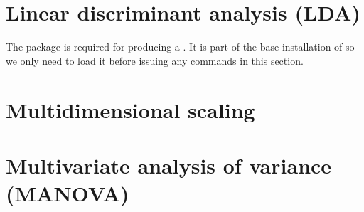 \section{Linear discriminant analysis (LDA)} 
 
The  package is required for producing a . It is part of the base installation of \R{} so we only need to load it before issuing any commands in this section. 
\begin{knitrout}
\color{fgcolor}\begin{kframe}
\begin{alltt}
\hlstd{> }
\end{alltt}


{\ttfamily\noindent\itshape\color{messagecolor}{Loading required package: MASS}}

{\ttfamily\noindent\itshape\color{messagecolor}{\\Attaching package: 'MASS'}}

{\ttfamily\noindent\itshape\color{messagecolor}{The following object is masked from 'package:dplyr':

\ \ \ \ select}}\end{kframe}
\end{knitrout}
 
\section{Multidimensional scaling} 
 
\section{Multivariate analysis of variance (MANOVA)} 
 
 
\section{} 
 
 
\section{} 
 
 
\section{} 
 
 
\section{} 
 
 
\section{} 
 
 
\section{} 
 
 
 


